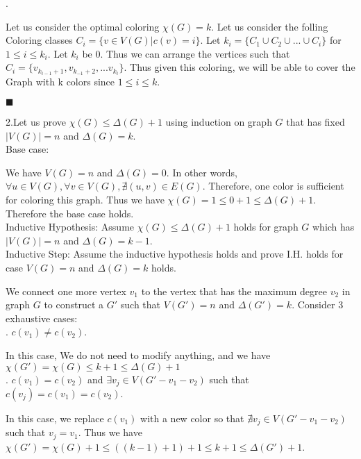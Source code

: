 \documentclass[12pt]{article}
\begin{document}
	.
	
	Let us consider the optimal coloring $\chi(G) = k$. Let us consider the folling Coloring classes $C_i = \{v \in V(G) | c(v) = i\}$. Let $k_i = \{C_1 \cup C_2 \cup ... \cup C_i\}$ for $1 \leq i \leq k_i$. Let $k_i$ be 0. Thus we can arrange the vertices such that $C_i = \{v_{k_{i-1}+1},v_{k_{-1}+2},...v_{k_i}\}$. Thus given this coloring, we will be able to cover the Graph with k colors since $1 \leq i \leq k$.
	
	\hfill $\blacksquare$
	
	\noindent2.Let us prove $\chi(G) \leq \Delta(G) + 1$ using induction on graph $G$ that has fixed $|V(G)| = n$ and $\Delta(G) = k$.\\
	
	\noindent Base case:
	
	We have $V(G) = n$ and $\Delta(G) = 0$. In other words, $\forall u \in V(G), \forall v \in V(G) , \nexists (u,v) \in E(G)$. Therefore, one color is sufficient for coloring this graph. Thus we have $\chi(G) = 1 \leq 0+1 \leq \Delta(G) + 1$. Therefore the base case holds.\\
	
	 \noindent Inductive Hypothesis: Assume $\chi(G) \leq \Delta(G) + 1$ holds for graph $G$ which has $|V(G)| = n$ and $\Delta(G) = k -1$.\\
	 
	 \noindent Inductive Step: Assume the inductive hypothesis holds and prove I.H. holds for case $V(G) = n$ and $\Delta(G) = k$ holds.
	 
	 We connect one more vertex $v_1$ to the vertex that has the maximum degree $v_2$ in graph $G$ to construct a $G'$ such that $V(G') = n$ and $\Delta(G') = k$. Consider 3 exhaustive cases:\\
	 
	 . $c(v_1) \neq c(v_2)$.
	 
	 In this case, We do not need to modify anything, and we have $\chi(G') = \chi(G) \leq k+1 \leq \Delta(G) + 1$\\
	 
	 . $c(v_1) = c(v_2)$ and $\exists v_j \in V(G'-v_1 - v_2)$ such that $c(v_j) = c(v_1) = c(v_2)$.
	 
	 In this case, we replace $c(v_1)$ with a new color so that $\nexists v_j \in V(G' - v_1 -v_2)$ such that $v_j = v_1$. Thus we have $\chi(G') = \chi(G) + 1 \leq ((k-1)+1)+1 \leq k+1 \leq \Delta(G')+1$.\\
	 
\end{document}
